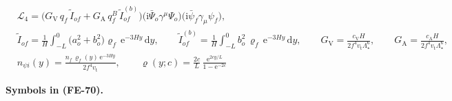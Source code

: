 \documentclass[
  10pt,
]{article}
\begin{document}
\[
\begin{aligned}
&\mathcal{L}_4 = \big(G_{\mathrm{V}}\,q_f\,\tilde I_{of} + G_{\mathrm{A}}\,q^{B}_f\,\tilde I^{(b)}_{of}\big)
 \big(\mathrm{i}\bar\Psi_o\gamma^\mu\Psi_o\big)\big(\mathrm{i}\bar\psi_f\gamma_\mu\psi_f\big),\\
&\tilde I_{of} = \frac{1}{H}\int_{-L}^{0}\big(a_o^2 +
 b_o^2\big)\varrho_f\,\mathrm{e}^{-3Hy}\,\mathrm{d}y,\qquad
 \tilde I^{(b)}_{of} = \frac{1}{H}\int_{-L}^{0}b_o^2\,\varrho_f\,\mathrm{e}^{-3Hy}\,\mathrm{d}y,\qquad
 G_{\mathrm{V}} = \frac{c_{\mathrm{V}}H}{2f^4v_{\mathrm{t}}\Lambda_\star^6},\qquad
 G_{\mathrm{A}} = \frac{c_{\mathrm{A}}H}{2f^4v_{\mathrm{t}}\Lambda_\star^6},\\
&n_{\psi i}(y) = \frac{n_f\,\varrho_f(y)\,\mathrm{e}^{-3Hy}}{2f^4v_{\mathrm{t}}},\qquad
 \varrho(y; c) = \frac{2c}{L}\,\frac{\mathrm{e}^{2cy/L}}{1 - \mathrm{e}^{-2c}}
\end{aligned} \tag{FE-70}
\]

\textbf{Symbols in (FE-70).}
\end{document}
